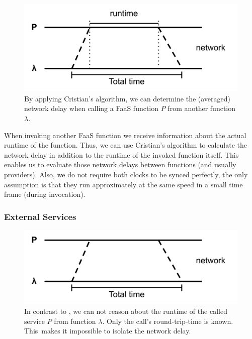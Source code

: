 \documentclass[../main.tex]{subfiles}
\begin{document}
\begin{figure}
\begin{center}
  \includegraphics[]{./cristian.png}
\end{center}
\caption[Function Call Time Measurement]{%
  By applying Cristian's algorithm, we can determine the (averaged) network delay when calling 
  a FaaS function $P$ from another function $\lambda$.
}
\label{fig:cristiansTimeMeasurement}
\end{figure}

When invoking another FaaS function we receive information about the actual runtime of the function.
Thus, we can use Cristian's algorithm \cite{cristian_probabilistic_1989} to calculate the network delay 
in addition to the runtime of the invoked function itself. 
This enables us to evaluate those network delays between functions (and usually providers). 
Also, we do not require both clocks to be synced perfectly, 
the only assumption is that they run approximately at the same speed in a small time frame (during invocation).

\subsubsection{External Services}%
\label{ssub:callingTimeProbeService}

\begin{figure}
\begin{center}
  \includegraphics[]{./round-trip-time.png}
\end{center}
\caption[External Service Time Measurement]{%
  In contrast to , we can not reason about the runtime of the called service $P$ 
  from function $\lambda.$ Only the call's round-trip-time is known. 
  This~makes it impossible to isolate the network delay.
}
\label{fig:externalServiceTimeMeasurement}
\end{figure}
\end{document}
